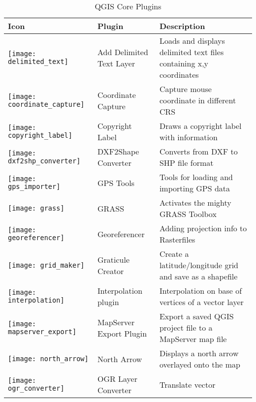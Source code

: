 \begin{minipage}{\textwidth}
\begin{table}[H]
\centering
\caption{QGIS Core Plugins}\label{tab:core_plugins}\medskip
\small
 \begin{tabular}{|l|l|p{4in}|}
\hline \textbf{Icon} & \textbf{Plugin} & \textbf{Description}\\
\hline
\texttt{[image: delimited\_text]}
 & Add Delimited Text Layer \index{plugins!delimited text} & Loads and displays
delimited text files containing x,y coordinates\\
\hline
\texttt{[image: coordinate\_capture]}
 & Coordinate Capture \index{plugins!coordinate capture}& Capture mouse
coordinate in different CRS\\
\hline 
\texttt{[image: copyright\_label]}
 & Copyright Label \index{plugins!copyright}& Draws a copyright label with
information\\
\hline 
\texttt{[image: dxf2shp\_converter]}
 & DXF2Shape Converter \index{plugins!DXF2Shape}& Converts from DXF to SHP file
format\\
\hline
\texttt{[image: gps\_importer]}
 & GPS Tools \index{plugins!gps}& Tools for loading and importing GPS data\\
\hline
\texttt{[image: grass]}
 & GRASS \index{plugin!grass toolbox} & Activates the mighty GRASS Toolbox\\
\hline
\texttt{[image: georeferencer]}
 & Georeferencer \index{plugin!georeferencer} & Adding projection info to
Rasterfiles\\
\hline
\texttt{[image: grid\_maker]}
 & Graticule Creator \index{plugins!graticule}& Create a latitude/longitude grid
and save as a shapefile\\
\hline
\texttt{[image: interpolation]}
& Interpolation plugin \index{plugins!Interpolation}& Interpolation on base of
vertices of a vector layer\\
\hline
\texttt{[image: mapserver\_export]}
& MapServer Export Plugin \index{plugins!MapServer Export}& Export a saved QGIS
project file to a MapServer map file \\
\hline
\texttt{[image: north\_arrow]}
& North Arrow \index{plugins!north arrow}& Displays a north arrow overlayed onto
the map\\
\hline
\texttt{[image: ogr\_converter]}
 & OGR Layer Converter \index{plugins!OGR converter} & Translate vector

\end{tabular}
\end{table}
\end{minipage}
